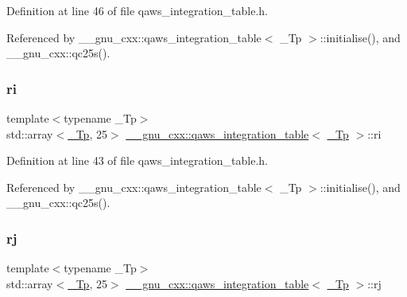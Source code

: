 Definition at line 46 of file qaws\+\_\+integration\+\_\+table.\+h.



Referenced by \+\_\+\+\_\+gnu\+\_\+cxx\+::qaws\+\_\+integration\+\_\+table$<$ \+\_\+\+Tp $>$\+::initialise(), and \+\_\+\+\_\+gnu\+\_\+cxx\+::qc25s().

\mbox{\label{struct____gnu__cxx_1_1qaws__integration__table_aa38340ca8677164ecd511a35d5d2a8e7}} 
\subsubsection{\texorpdfstring{ri}{ri}}
{\footnotesize\ttfamily template$<$typename \+\_\+\+Tp$>$ \\
std\+::array$<$\hyperlink{namespace____gnu__cxx_a3b19a9c800ca194374ef9172290f7d79}{\+\_\+\+Tp}, 25$>$ \hyperlink{struct____gnu__cxx_1_1qaws__integration__table}{\+\_\+\+\_\+gnu\+\_\+cxx\+::qaws\+\_\+integration\+\_\+table}$<$ \hyperlink{namespace____gnu__cxx_a3b19a9c800ca194374ef9172290f7d79}{\+\_\+\+Tp} $>$\+::ri}



Definition at line 43 of file qaws\+\_\+integration\+\_\+table.\+h.



Referenced by \+\_\+\+\_\+gnu\+\_\+cxx\+::qaws\+\_\+integration\+\_\+table$<$ \+\_\+\+Tp $>$\+::initialise(), and \+\_\+\+\_\+gnu\+\_\+cxx\+::qc25s().

\mbox{\label{struct____gnu__cxx_1_1qaws__integration__table_a1b6aa4c79cb8c470510cabc5a502327c}} 
\subsubsection{\texorpdfstring{rj}{rj}}
{\footnotesize\ttfamily template$<$typename \+\_\+\+Tp$>$ \\
std\+::array$<$\hyperlink{namespace____gnu__cxx_a3b19a9c800ca194374ef9172290f7d79}{\+\_\+\+Tp}, 25$>$ \hyperlink{struct____gnu__cxx_1_1qaws__integration__table}{\+\_\+\+\_\+gnu\+\_\+cxx\+::qaws\+\_\+integration\+\_\+table}$<$ \hyperlink{namespace____gnu__cxx_a3b19a9c800ca194374ef9172290f7d79}{\+\_\+\+Tp} $>$\+::rj}



